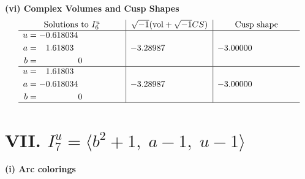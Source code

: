 \documentclass[1p]{elsarticle_modified}
\theoremstyle{definition}
\newcommand{\I}{\sqrt{-1}}
\begin{document}
\newpage\flushleft \textbf{(vi) Complex Volumes and Cusp Shapes}
$$\begin{array}{c|c|c}  
\text{Solutions to }I^u_{6}& \I (\text{vol} + \sqrt{-1}CS) & \text{Cusp shape}\\
 \hline 
\begin{aligned}
u &= -0.618034\phantom{ +0.000000I} \\
a &= \phantom{-}1.61803\phantom{ +0.000000I} \\
b &= \phantom{-0.000000 } 0\end{aligned}
 & -3.28987\phantom{ +0.000000I} & -3.00000\phantom{ +0.000000I} \\ \hline\begin{aligned}
u &= \phantom{-}1.61803\phantom{ +0.000000I} \\
a &= -0.618034\phantom{ +0.000000I} \\
b &= \phantom{-0.000000 } 0\end{aligned}
 & -3.28987\phantom{ +0.000000I} & -3.00000\phantom{ +0.000000I}\\
 \hline 
 \end{array}$$\newpage\newpage\renewcommand{\arraystretch}{1}
\centering \section*{VII. $I^u_{7}= \langle b^2+1,\;a-1,\;u-1 \rangle$}
\flushleft \textbf{(i) Arc colorings}\\
\end{document}
